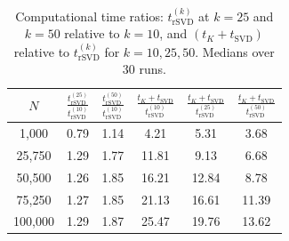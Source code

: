 \begin{table}[ht]
\centering
    \begin{tabular}{c c c c c c}
    \toprule
        $N$ &
        $\tfrac{t^{(25)}_{\text{rSVD}}}{t^{(10)}_{\text{rSVD}}}$ &
        $\tfrac{t^{(50)}_{\text{rSVD}}}{t^{(10)}_{\text{rSVD}}}$ & 
        $\tfrac{t_K + t_{\text{SVD}}}  {t^{(10)}_{\text{rSVD}}}$ &
        $\tfrac{t_K + t_{\text{SVD}}}  {t^{(25)}_{\text{rSVD}}}$ &
        $\tfrac{t_K + t_{\text{SVD}}}  {t^{(50)}_{\text{rSVD}}}$ \\
    \midrule
        1,000   & 0.79 & 1.14 & 4.21  & 5.31  & 3.68 \\
        25,750  & 1.29 & 1.77 & 11.81 & 9.13  & 6.68 \\
        50,500  & 1.26 & 1.85 & 16.21 & 12.84 & 8.78 \\
        75,250  & 1.27 & 1.85 & 21.13 & 16.61 & 11.39 \\
        100,000 & 1.29 & 1.87 & 25.47 & 19.76 & 13.62 \\
    \bottomrule
    \end{tabular}

\caption{Computational time ratios: $t^{(k)}_{\text{rSVD}}$ at $k = 25$ and $k = 50$ relative to $k = 10$, and $(t_K + t_{\text{SVD}})$ relative to $t^{(k)}_{\text{rSVD}}$ for $k = 10, 25, 50$. Medians over 30 runs.
} 
\label{tab:rsvd_computational_time_comp}
\end{table}